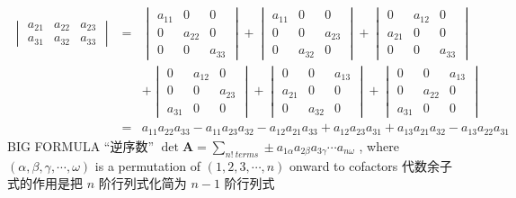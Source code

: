 \documentclass[12pt, a4paper]{article}
\begin{document}
{\begin{math}
\begin{array}{lcl}
\begin{vmatrix}
			a_{21} & a_{22} & a_{23} \\
			a_{31} & a_{32} & a_{33} 
		\end{vmatrix}
		& = &
		\begin{vmatrix}
			a_{11} & 0 & 0 \\
			0 & a_{22} & 0 \\
			0 & 0 & a_{33} 
		\end{vmatrix}
		+ 
		\begin{vmatrix}
			a_{11} & 0 & 0 \\
			0 & 0 & a_{23} \\
			0 & a_{32} & 0 
		\end{vmatrix}
		+ 
		\begin{vmatrix}
			0 & a_{12} & 0 \\
			a_{21} & 0 & 0 \\
			0 & 0 & a_{33} 
		\end{vmatrix}
		\\
		&   &
		+ 
		\begin{vmatrix}
			0 & a_{12} & 0 \\
			0 & 0 & a_{23} \\
			a_{31} & 0 & 0 
		\end{vmatrix}
		+ 
		\begin{vmatrix}
			0 & 0 & a_{13} \\
			a_{21} & 0 & 0 \\
			0 & a_{32} & 0 
		\end{vmatrix}
		+ 
		\begin{vmatrix}
			0 & 0 & a_{13} \\
			0 & a_{22} & 0 \\
			a_{31} & 0 & 0 
		\end{vmatrix}
		\\
		& = &
		a_{11}a_{22}a_{33}-a_{11}a_{23}a_{32}-a_{12}a_{21}a_{33}+a_{12}a_{23}a_{31}+a_{13}a_{21}a_{32}-a_{13}a_{22}a_{31}
	\end{array}
\end{math}
\vspace{31pt}
\newline
BIG FORMULA \quad “逆序数”
\newline
$\det{\mathbf{A}} = \sum\limits_{n! \ terms} \pm a_{1\alpha}a_{2\beta}a_{3\gamma} \cdots a_{n\omega}$ , where $\left(\alpha, \beta, \gamma, \cdots, \omega\right)$ is a permutation of $\left(1, 2, 3, \cdots, n\right)$
\vspace{31pt}
\newline
onward to cofactors {\textcolor{anhao-scarlet}{代数余子式的作用是把 $n$ 阶行列式化简为 $n-1$ 阶行列式}}
}
\end{document}
